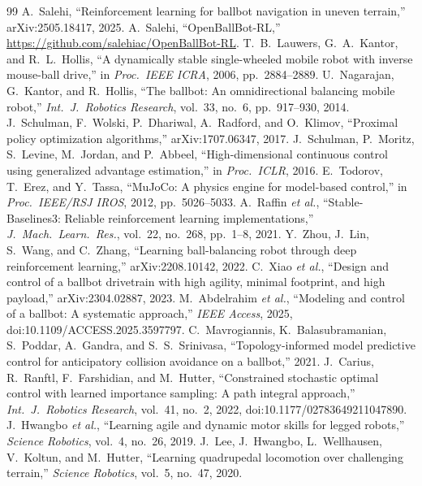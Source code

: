 \documentclass[conference]{IEEEtran}
\begin{document}
\begin{thebibliography}{99}\small
{} A.~Salehi, ``Reinforcement learning for ballbot navigation in uneven terrain,'' arXiv:2505.18417, 2025.
 A.~Salehi, ``OpenBallBot-RL,'' \url{https://github.com/salehiac/OpenBallBot-RL}.
 T.~B.~Lauwers, G.~A.~Kantor, and R.~L.~Hollis, ``A dynamically stable single-wheeled mobile robot with inverse mouse-ball drive,'' in \emph{Proc.\ IEEE ICRA}, 2006, pp.~2884--2889.
 U.~Nagarajan, G.~Kantor, and R.~Hollis, ``The ballbot: An omnidirectional balancing mobile robot,'' \emph{Int.\ J.\ Robotics Research}, vol.~33, no.~6, pp.~917--930, 2014.
 J.~Schulman, F.~Wolski, P.~Dhariwal, A.~Radford, and O.~Klimov, ``Proximal policy optimization algorithms,'' arXiv:1707.06347, 2017.
 J.~Schulman, P.~Moritz, S.~Levine, M.~Jordan, and P.~Abbeel, ``High-dimensional continuous control using generalized advantage estimation,'' in \emph{Proc.\ ICLR}, 2016.
 E.~Todorov, T.~Erez, and Y.~Tassa, ``MuJoCo: A physics engine for model-based control,'' in \emph{Proc.\ IEEE/RSJ IROS}, 2012, pp.~5026--5033.
 A.~Raffin \emph{et al.}, ``Stable-Baselines3: Reliable reinforcement learning implementations,'' \emph{J.\ Mach.\ Learn.\ Res.}, vol.~22, no.~268, pp.~1--8, 2021.
 Y.~Zhou, J.~Lin, S.~Wang, and C.~Zhang, ``Learning ball-balancing robot through deep reinforcement learning,'' arXiv:2208.10142, 2022.
 C.~Xiao \emph{et al.}, ``Design and control of a ballbot drivetrain with high agility, minimal footprint, and high payload,'' arXiv:2304.02887, 2023.
 M.~Abdelrahim \emph{et al.}, ``Modeling and control of a ballbot: A systematic approach,'' \emph{IEEE Access}, 2025, doi:10.1109/ACCESS.2025.3597797.
 C.~Mavrogiannis, K.~Balasubramanian, S.~Poddar, A.~Gandra, and S.~S.~Srinivasa, ``Topology-informed model predictive control for anticipatory collision avoidance on a ballbot,'' 2021.
 J.~Carius, R.~Ranftl, F.~Farshidian, and M.~Hutter, ``Constrained stochastic optimal control with learned importance sampling: A path integral approach,'' \emph{Int.\ J.\ Robotics Research}, vol.~41, no.~2, 2022, doi:10.1177/02783649211047890.
 J.~Hwangbo \emph{et al.}, ``Learning agile and dynamic motor skills for legged robots,'' \emph{Science Robotics}, vol.~4, no.~26, 2019.
 J.~Lee, J.~Hwangbo, L.~Wellhausen, V.~Koltun, and M.~Hutter, ``Learning quadrupedal locomotion over challenging terrain,'' \emph{Science Robotics}, vol.~5, no.~47, 2020.

\end{thebibliography}
\end{document}
